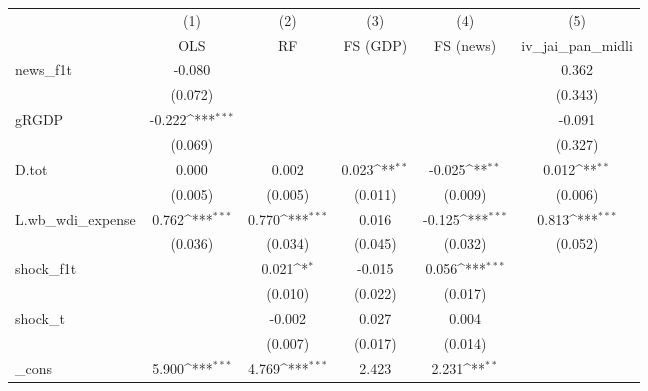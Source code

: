 {
\def\sym#1{\ifmmode^{#1}\else\(^{#1}\)\fi}
\begin{tabular}{l*{5}{c}}
\toprule
            &\multicolumn{1}{c}{(1)}&\multicolumn{1}{c}{(2)}&\multicolumn{1}{c}{(3)}&\multicolumn{1}{c}{(4)}&\multicolumn{1}{c}{(5)}\\
            &\multicolumn{1}{c}{OLS}&\multicolumn{1}{c}{RF}&\multicolumn{1}{c}{FS (GDP)}&\multicolumn{1}{c}{FS (news)}&\multicolumn{1}{c}{iv\_jai\_pan\_midli}\\
\midrule
news\_f1t    &      -0.080         &                     &                     &                     &       0.362         \\
            &     (0.072)         &                     &                     &                     &     (0.343)         \\
\addlinespace
gRGDP       &      -0.222\sym{***}&                     &                     &                     &      -0.091         \\
            &     (0.069)         &                     &                     &                     &     (0.327)         \\
\addlinespace
D.tot       &       0.000         &       0.002         &       0.023\sym{**} &      -0.025\sym{**} &       0.012\sym{**} \\
            &     (0.005)         &     (0.005)         &     (0.011)         &     (0.009)         &     (0.006)         \\
\addlinespace
L.wb\_wdi\_expense&       0.762\sym{***}&       0.770\sym{***}&       0.016         &      -0.125\sym{***}&       0.813\sym{***}\\
            &     (0.036)         &     (0.034)         &     (0.045)         &     (0.032)         &     (0.052)         \\
\addlinespace
shock\_f1t   &                     &       0.021\sym{*}  &      -0.015         &       0.056\sym{***}&                     \\
            &                     &     (0.010)         &     (0.022)         &     (0.017)         &                     \\
\addlinespace
shock\_t     &                     &      -0.002         &       0.027         &       0.004         &                     \\
            &                     &     (0.007)         &     (0.017)         &     (0.014)         &                     \\
\addlinespace
\_cons      &       5.900\sym{***}&       4.769\sym{***}&       2.423         &       2.231\sym{**} &                     \\

\end{tabular}}
